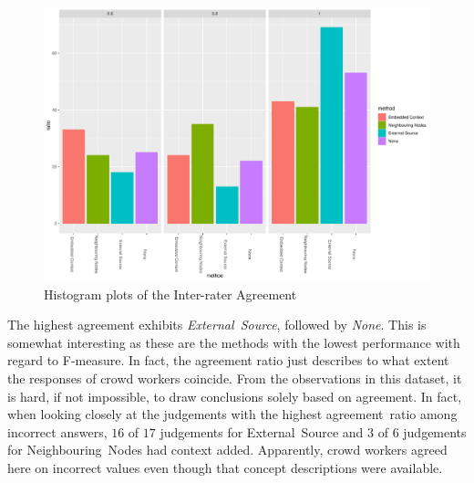 \begin{figure}
  	 \includegraphics[width=\textwidth]{plots/climate_change/hist_agreement}
  	 \caption{Histogram plots of the Inter-rater Agreement}\label{fig:hist_agreement_all}
\end{figure}

The highest agreement exhibits \emph{External~Source}, followed by \emph{None}. This is somewhat interesting as these are the methods with the lowest performance with regard to F-measure. In fact, the agreement ratio just describes to what extent the responses of crowd workers coincide. From the observations in this dataset, it is hard, if not impossible, to draw conclusions solely based on agreement. In fact, when looking closely at the judgements with the highest agreement~ratio among incorrect answers, $16$ of $17$ judgements for External~Source and $3$ of $6$ judgements for Neighbouring~Nodes had context added. Apparently, crowd workers agreed here on incorrect values even though that concept descriptions were available. 

